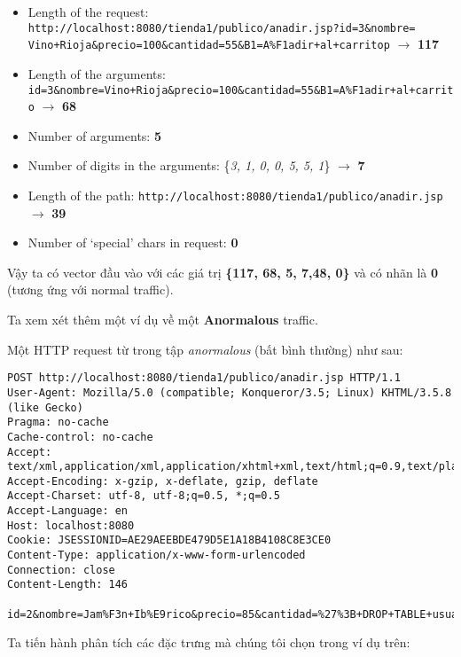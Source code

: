 \documentclass[../main-report.tex]{subfiles}
\begin{document}
\begin{itemize}
\item Length of the request: \lstinline{http://localhost:8080/tienda1/publico/anadir.jsp?id=3&nombre= Vino+Rioja&precio=100&cantidad=55&B1=A%F1adir+al+carritop}{} $\to$ \textbf{117}
\item Length of the arguments: \lstinline{id=3&nombre=Vino+Rioja&precio=100&cantidad=55&B1=A%F1adir+al+carrito}{} $\to$ \textbf{68}
\item Number of arguments: \textbf{5}
\item Number of digits in the arguments: \{\emph{3, 1, 0, 0, 5, 5, 1}\} $\to$ \textbf{7}
\item Length of the path: \lstinline{http://localhost:8080/tienda1/publico/anadir.jsp} $\to$ \textbf{39}
\item Number of `special' chars in request: \textbf{0}
\end{itemize}

Vậy ta có vector đầu vào với các giá trị \textbf{\{117, 68, 5, 7,48, 0\}} và có nhãn là \textbf{0} (tương ứng với normal traffic).

Ta xem xét thêm một ví dụ về một \textbf{Anormalous} traffic.

\begin{example}
Một HTTP request từ trong tập \emph{anormalous} (bất bình thường) như sau:

\begin{lstlisting}
POST http://localhost:8080/tienda1/publico/anadir.jsp HTTP/1.1
User-Agent: Mozilla/5.0 (compatible; Konqueror/3.5; Linux) KHTML/3.5.8 (like Gecko)
Pragma: no-cache
Cache-control: no-cache
Accept: text/xml,application/xml,application/xhtml+xml,text/html;q=0.9,text/plain;q=0.8,image/png,*/*;q=0.5
Accept-Encoding: x-gzip, x-deflate, gzip, deflate
Accept-Charset: utf-8, utf-8;q=0.5, *;q=0.5
Accept-Language: en
Host: localhost:8080
Cookie: JSESSIONID=AE29AEEBDE479D5E1A18B4108C8E3CE0
Content-Type: application/x-www-form-urlencoded
Connection: close
Content-Length: 146

id=2&nombre=Jam%F3n+Ib%E9rico&precio=85&cantidad=%27%3B+DROP+TABLE+usuarios%3B+SELECT+*+FROM+datos+WHERE+nombre+LIKE+%27%25&B1=A%F1adir+al+carrito
\end{lstlisting}
\end{example} 

Ta tiến hành phân tích các đặc trưng mà chúng tôi chọn trong ví dụ trên:
\end{document}
